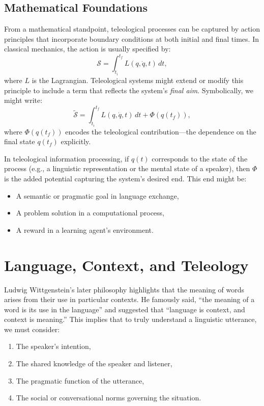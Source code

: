 \documentclass[11pt]{article}
\begin{document}
\subsection{Mathematical Foundations}
From a mathematical standpoint, teleological processes can be captured by action principles that incorporate boundary conditions at both initial and final times. In classical mechanics, the action is usually specified by:
\begin{equation}
    \mathcal{S} = \int_{t_i}^{t_f} L(q, \dot{q}, t)\, dt,
\end{equation}
where $L$ is the Lagrangian. Teleological systems might extend or modify this principle to include a term that reflects the system's \emph{final aim}. Symbolically, we might write:
\begin{equation}
    \tilde{\mathcal{S}} = \int_{t_i}^{t_f} L(q, \dot{q}, t)\, dt + \Phi(q(t_f)),
\end{equation}
where $\Phi(q(t_f))$ encodes the teleological contribution---the dependence on the final state $q(t_f)$ explicitly.

In teleological information processing, if $q(t)$ corresponds to the state of the process (e.g., a linguistic representation or the mental state of a speaker), then $\Phi$ is the added potential capturing the system's desired end. This end might be:
\begin{itemize}
    \item A semantic or pragmatic goal in language exchange,
    \item A problem solution in a computational process,
    \item A reward in a learning agent's environment.
\end{itemize}

\section{Language, Context, and Teleology}
\label{sec:language-wittgenstein}
Ludwig Wittgenstein’s later philosophy highlights that the meaning of words arises from their use in particular contexts. He famously said, ``the meaning of a word is its use in the language'' and suggested that ``language is context, and context is meaning.'' This implies that to truly understand a linguistic utterance, we must consider:
\begin{enumerate}
    \item The speaker’s intention,
    \item The shared knowledge of the speaker and listener,
    \item The pragmatic function of the utterance,
    \item The social or conversational norms governing the situation.
\end{enumerate}
\end{document}
